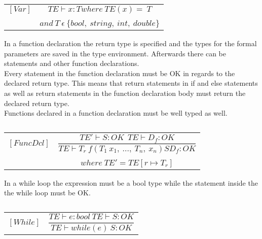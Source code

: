 \begin{table}[H]
    \begin{center}
    \begin{longtable}[c] { r c }
        $[Var]$ 
        & 
        \( {T E  \vdash x  :  T} {where \ T E(x)=\ T} \)
         \\ \\
        & 
        \( {and \ T \ \epsilon \ \{bool,\ string,\ int,\ double\}} \)
    \end{longtable}
    \caption{}\label{s-empty}
        \end{center}
\end{table}
In a function declaration the return type is specified and the types for the formal parameters are saved in the type environment. Afterwards there can be statements and other function declarations. \\
Every statement in the function declaration must be OK in regards to the declared return type. This means that return statements in if and else statements as well as return statements in the function declaration body must return the declared return type. \\ 
Functions declared in a function declaration must be well typed as well.
\begin{table}[H]
    \begin{center}
    \begin{longtable}[c] { r c }
        $[FuncDcl]$ 
        & 
        \( \dfrac{TE' \vdash S : OK \ \ TE \vdash D_{f}: OK} 
        {T E \vdash T_r \ f(T_1 \ x_1,\ ...,\ T_n,\ x_n)S D_f : OK} \) 
        \\ \\
        & 
        \( {where \ TE' = TE[r \mapsto T_r]} \)
    \end{longtable}
    \caption{}\label{s-empty}
        \end{center}
\end{table}

In a while loop the expression must be a bool type while the statement inside the the while loop must be OK.
\begin{table}[H]
    \begin{center}
    \begin{longtable}[c] { r c }
        $[While]$ 
        & 
        \( \dfrac{T E  \vdash e  :  bool \ T E \vdash S : OK}{T E \vdash while(e) \ S : OK} \)

    \end{longtable}
    \caption{}\label{s-empty}
        \end{center}
\end{table}

